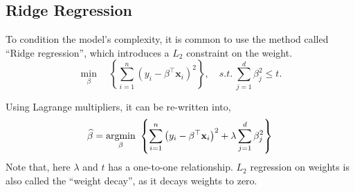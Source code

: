 \subsection{Ridge Regression}
\begin{definition}
To condition the model's complexity, it is common to use the method called ``Ridge regression'', which introduces a $L_2$ constraint on the weight. 
\begin{equation}
	\min_{\beta}\quad \left\{\sum_{i=1}^{n}\left(y_{i}-\beta^{\top} \mathbf{x}_{i}\right)^{2} \right\}, \quad s.t.\ \sum_{j=1}^{d}\beta_{j}^2 \leq t.
\end{equation}
\end{definition}
Using  Lagrange multipliers, it can be re-written into, 
\begin{equation}
\widehat{\beta}=\argmin _{\beta}\ \left\{\sum_{i=1}^{n}\left(y_{i}-\beta^{\top} \mathbf{x}_{i}\right)^{2}+\lambda \sum_{j=1}^{d}\beta_{j}^2 \right\} 
\end{equation}
Note that, here $\lambda$ and $t$ has a one-to-one relationship.
$L_2$ regression on weights is also called the ``weight decay'', as it decays weights to zero.

